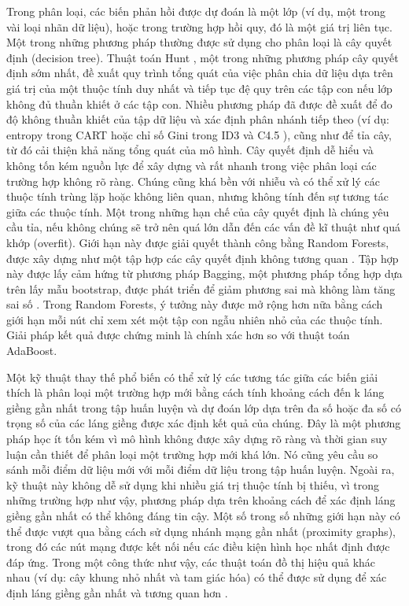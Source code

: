 \documentclass[utf8]{frontiersSCNS} %
\begin{document}
Trong phân loại, các biến phản hồi được dự đoán là một lớp (ví dụ, một trong vài loại nhãn dữ liệu), hoặc trong trường hợp hồi quy, đó là một giá trị liên tục. Một trong những phương pháp thường được sử dụng cho phân loại là cây quyết định (decision tree). Thuật toán Hunt \citep{Tan2016}, một trong những phương pháp cây quyết định sớm nhất, đề xuất quy trình tổng quát của việc phân chia dữ liệu dựa trên giá trị của một thuộc tính duy nhất và tiếp tục đệ quy trên các tập con nếu lớp không đủ thuần khiết ở các tập con. Nhiều phương pháp đã được đề xuất để đo độ không thuần khiết của tập dữ liệu và xác định phân nhánh tiếp theo (ví dụ: entropy trong CART \citep{Breiman2017} hoặc chỉ số Gini trong ID3 \citep{Quinlan1986} và C4.5 \citep{Quinlan2014}), cũng như để tỉa cây, từ đó cải thiện khả năng tổng quát của mô hình. Cây quyết định dễ hiểu và không tốn kém nguồn lực để xây dựng và rất nhanh trong việc phân loại các trường hợp không rõ ràng. Chúng cũng khá bền với nhiễu và có thể xử lý các thuộc tính trùng lặp hoặc không liên quan, nhưng không tính đến sự tương tác giữa các thuộc tính. Một trong những hạn chế của cây quyết định là chúng yêu cầu tỉa, nếu không chúng sẽ trở nên quá lớn dẫn đến các vấn đề kĩ thuật như quá khớp (overfit). Giới hạn này được giải quyết thành công bằng Random Forests, được xây dựng như một tập hợp các cây quyết định không tương quan \citep{Breiman2001}. Tập hợp này được lấy cảm hứng từ phương pháp Bagging, một phương pháp tổng hợp dựa trên lấy mẫu bootstrap, được phát triển để giảm phương sai mà không làm tăng sai số \citep{Breiman1996}. Trong Random Forests, ý tưởng này được mở rộng hơn nữa bằng cách giới hạn mỗi nút chỉ xem xét một tập con ngẫu nhiên nhỏ của các thuộc tính. Giải pháp kết quả được chứng minh là chính xác hơn so với thuật toán AdaBoost.

Một kỹ thuật thay thế phổ biến có thể xử lý các tương tác giữa các biến giải thích là phân loại một trường hợp mới bằng cách tính khoảng cách đến k láng giềng gần nhất trong tập huấn luyện và dự đoán lớp dựa trên đa số hoặc đa số có trọng số của các láng giềng được xác định kết quả của chúng. Đây là một phương pháp học ít tốn kém vì mô hình không được xây dựng rõ ràng và thời gian suy luận cần thiết để phân loại một trường hợp mới khá lớn. Nó cũng yêu cầu so sánh mỗi điểm dữ liệu mới với mỗi điểm dữ liệu trong tập huấn luyện. Ngoài ra, kỹ thuật này không dễ sử dụng khi nhiều giá trị thuộc tính bị thiếu, vì trong những trường hợp như vậy, phương pháp dựa trên khoảng cách để xác định láng giềng gần nhất có thể không đáng tin cậy. Một số trong số những giới hạn này có thể được vượt qua bằng cách sử dụng nhánh mạng gần nhất (proximity graphs), trong đó các nút mạng được kết nối nếu các điều kiện hình học nhất định được đáp ứng. Trong một công thức như vậy, các thuật toán đồ thị hiệu quả khác nhau (ví dụ: cây khung nhỏ nhất và tam giác hóa) có thể được sử dụng để xác định láng giềng gần nhất và tương quan hơn \citep{Toussaint2005}.
\end{document}
